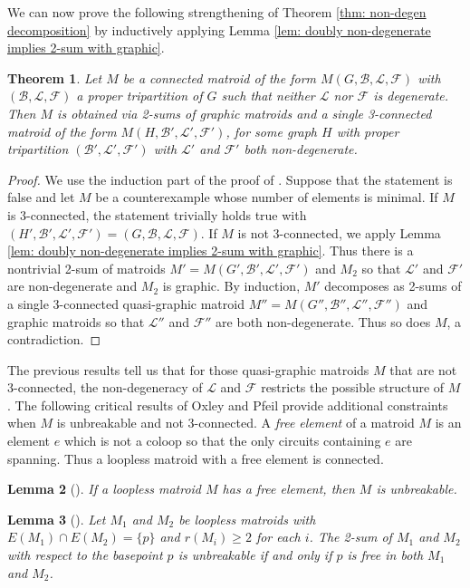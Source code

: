 \documentclass[12pt]{article}
\newtheorem{theorem}{Theorem}[section]
\newtheorem{lemma}[theorem]{Lemma}
\theoremstyle{definition}
\theoremstyle{plain} %
\newcommand{\cB}{\mathcal{B}}
\newcommand{\cF}{\mathcal{F}}
\newcommand{\cL}{\mathcal{L}}
\newcommand{\qbgp}{\ensuremath{(G',\cB',\cL',\cF')}}
\begin{document}
We can now prove the following strengthening of Theorem \ref{thm: non-degen decomposition} by inductively applying Lemma \ref{lem: doubly non-degenerate implies 2-sum with graphic}.

\begin{theorem}\label{thm: non-degen decomposition stronger}
    Let $M$ be a connected matroid of the form $M(G,\cB,\cL,\cF)$ with $(\cB,\cL,\cF)$ a proper tripartition of $G$ such that neither $\cL$ nor $\cF$ is degenerate. Then $M$ is obtained via 2-sums of graphic matroids and a single 3-connected matroid of the form $M(H,\cB',\cL',\cF')$, for some graph $H$ with proper tripartition $(\cB',\cL',\cF')$ with $\cL'$ and $\cF'$ both non-degenerate.
\end{theorem}
\begin{proof}
We use the induction part of the proof of \cite[Theorem 4.8]{Bowler-Funk-Slilaty20}. Suppose that the statement is false and let $M$ be a counterexample whose number of elements is minimal. If $M$ is $3$-connected, the statement trivially holds true with $(H', \cB', \cL', \cF') = (G, \cB, \cL, \cF)$. If $M$ is not $3$-connected, we apply Lemma \ref{lem: doubly non-degenerate implies 2-sum with graphic}. Thus there is a nontrivial 2-sum of matroids $M'=M\qbgp$ and $M_2$ so that $\cL'$ and $\cF'$ are non-degenerate and $M_2$ is graphic. By induction, $M'$ decomposes as 2-sums of a single 3-connected quasi-graphic matroid $M''=M(G'',\cB'',\cL'',\cF'')$ and graphic matroids so that $\cL''$ and $\cF''$ are both non-degenerate. Thus so does $M$, a contradiction.
\end{proof}


The previous results tell us that for those quasi-graphic matroids $M$ that are not 3-connected, the non-degeneracy of $\cL$ and $\cF$ restricts the possible structure of $M$. The following critical results of Oxley and Pfeil \cite{Oxley-Pfeil2022} provide additional constraints when $M$ is unbreakable and not 3-connected. A \emph{free element} of a matroid $M$ is an element $e$ which is not a coloop so that the only circuits containing $e$ are spanning. Thus a loopless matroid with a free element is connected.
\begin{lemma}[{\cite[Lemma 3.5]{Oxley-Pfeil2022}}] \label{lem: free element implies unbreakable}
    If a loopless matroid $M$ has a free element, then $M$ is unbreakable.
\end{lemma}

\begin{lemma}[{\cite[Lemma 3.6]{Oxley-Pfeil2022}}] \label{lem: 2-sum is unbreakable iff free element}
    Let $M_1$ and $M_2$ be loopless matroids with $E(M_1) \cap E(M_2)=\{p\}$ and $r(M_i)\geq 2$ for each $i$. The 2-sum of $M_1$ and $M_2$ with respect to the basepoint $p$ is unbreakable if and only if $p$ is free in both $M_1$ and $M_2$.
\end{lemma}
\end{document}

